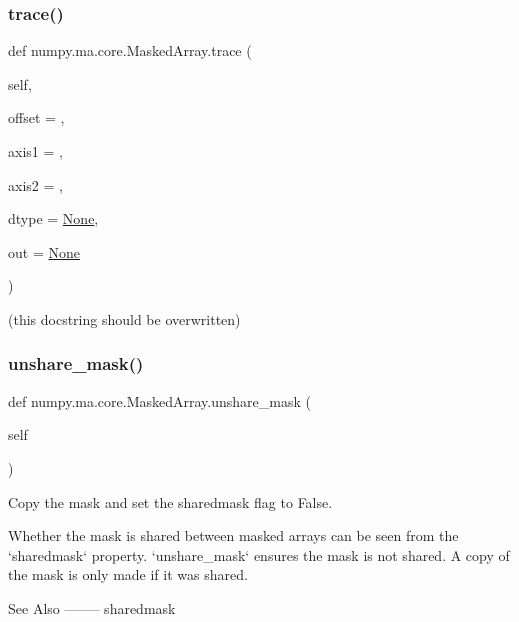 \subsubsection{\texorpdfstring{trace()}{trace()}}
{\footnotesize\ttfamily def numpy.\+ma.\+core.\+Masked\+Array.\+trace (\begin{DoxyParamCaption}\item[{}]{self,  }\item[{}]{offset = {},  }\item[{}]{axis1 = {},  }\item[{}]{axis2 = {},  }\item[{}]{dtype = {\ttfamily \hyperlink{namespacenumpy_1_1ma_1_1core_a647ee1848dfa3692fe35a663a2aa40b3}{None}},  }\item[{}]{out = {\ttfamily \hyperlink{namespacenumpy_1_1ma_1_1core_a647ee1848dfa3692fe35a663a2aa40b3}{None}} }\end{DoxyParamCaption})}

\begin{DoxyVerb}(this docstring should be overwritten)
\end{DoxyVerb}
 \mbox{\label{classnumpy_1_1ma_1_1core_1_1MaskedArray_a642e4716a125d72052d8d44b4fb72e5d}} 
\subsubsection{\texorpdfstring{unshare\+\_\+mask()}{unshare\_mask()}}
{\footnotesize\ttfamily def numpy.\+ma.\+core.\+Masked\+Array.\+unshare\+\_\+mask (\begin{DoxyParamCaption}\item[{}]{self }\end{DoxyParamCaption})}

\begin{DoxyVerb}Copy the mask and set the sharedmask flag to False.

Whether the mask is shared between masked arrays can be seen from
the `sharedmask` property. `unshare_mask` ensures the mask is not shared.
A copy of the mask is only made if it was shared.

See Also
--------
sharedmask\end{DoxyVerb}
 \mbox{\label{classnumpy_1_1ma_1_1core_1_1MaskedArray_a5f25a841a35ea1c45c8f54a96436ecab}} 
